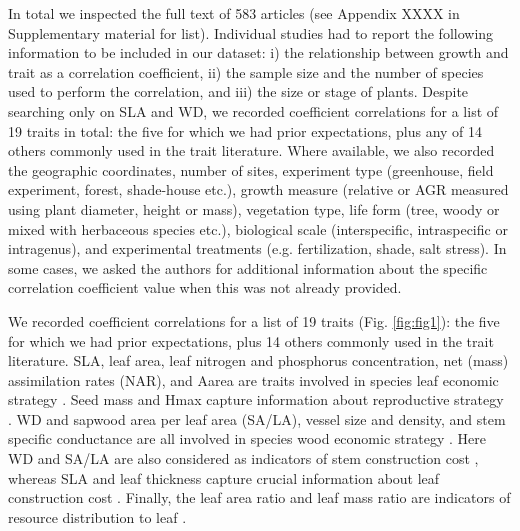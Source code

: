 \documentclass[a4paper,11pt]{article}
\begin{document}
In total we inspected the full text of 583 articles (see Appendix XXXX in Supplementary material for list). Individual studies had to report the following information to be included in our dataset: i) the relationship between growth and trait as a correlation coefficient, ii) the sample size and the number of species used to perform the correlation, and iii) the size or stage of plants. Despite searching only on SLA and WD, we recorded coefficient correlations for a list of 19 traits in total: the five for which we had prior expectations, plus any of 14 others commonly used in the trait literature. Where available, we also recorded the geographic coordinates, number of sites, experiment type (greenhouse, field experiment, forest, shade-house etc.), growth measure (relative or AGR measured using plant diameter, height or mass), vegetation type, life form (tree, woody or mixed with herbaceous species etc.), biological scale (interspecific, intraspecific or intragenus), and experimental treatments (e.g. fertilization, shade, salt stress). In some cases, we asked the authors for additional information about the specific correlation coefficient value when this was not already provided.

We recorded coefficient correlations for a list of 19 traits (Fig. \ref{fig:fig1}): the five for which we had prior expectations, plus 14 others commonly used in the trait literature. SLA, leaf area, leaf nitrogen and phosphorus concentration, net (mass) assimilation rates (NAR), and Aarea are traits involved in species leaf economic strategy \citep{Wright:2004jb,Wright:2010tp}. Seed mass and Hmax capture information about reproductive strategy \citep{Falster:2005bw,Moles:2006ft}. WD and sapwood area per leaf area (SA/LA), vessel size and density, and stem specific conductance are all involved in species wood economic strategy  \citep{Chave:2009iy}. Here WD and SA/LA are also considered as indicators of stem construction cost \citep{Falster:2011ii}, whereas SLA and leaf thickness capture crucial information about leaf construction cost \citep{Wright:2004jb}. Finally, the leaf area ratio and leaf mass ratio are indicators of resource distribution to leaf \citep{Lambers:1992bj}.
\end{document}
